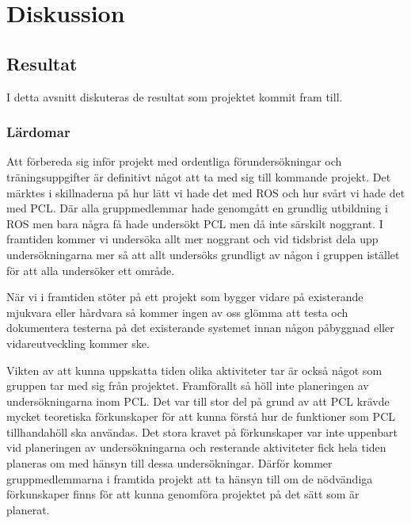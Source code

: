 \chapter{Diskussion}
\label{cha:discussion}

\section{Resultat}
\label{sec:discussion-results}


I detta avsnitt diskuteras de resultat som projektet kommit fram till.

\subsection{Lärdomar}

Att förbereda sig inför projekt med ordentliga förundersökningar och träningsuppgifter är definitivt något att ta med sig till kommande projekt. Det märktes i skillnaderna på hur lätt vi hade det med ROS och hur svårt vi hade det med PCL. Där alla gruppmedlemmar hade genomgått en grundlig utbildning i ROS men bara några få hade undersökt PCL men då inte särskilt noggrant. I framtiden kommer vi undersöka allt mer noggrant och vid tidsbrist dela upp undersökningarna mer så att allt undersöks grundligt av någon i gruppen istället för att alla undersöker ett område.

När vi i framtiden stöter på ett projekt som bygger vidare på existerande mjukvara eller hårdvara så kommer ingen av oss glömma att testa och dokumentera testerna på det existerande systemet innan någon påbyggnad eller vidareutveckling kommer ske.

Vikten av att kunna uppskatta tiden olika aktiviteter tar är också något som gruppen tar med sig från projektet. Framförallt så höll inte planeringen av undersökningarna inom PCL. Det var till stor del på grund av att PCL krävde mycket teoretiska förkunskaper för att kunna förstå hur de funktioner som PCL tillhandahöll ska användas. Det stora kravet på förkunskaper var inte uppenbart vid planeringen av undersökningarna och resterande aktiviteter fick hela tiden planeras om med hänsyn till dessa undersökningar. Därför kommer gruppmedlemmarna i framtida projekt att ta hänsyn till om de nödvändiga förkunskaper finns för att kunna genomföra projektet på det sätt som är planerat.

